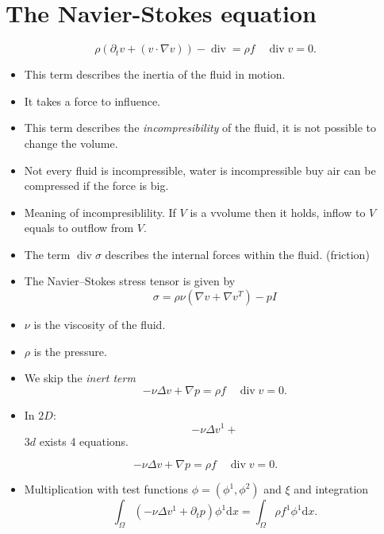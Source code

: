 \documentclass[
	a4paper,
	11pt,
	oneside
]{scrreprt}
\theoremstyle{definition}
\renewcommand{\div}{\operatorname{div}}
\begin{document}
\section{The Navier-Stokes equation}

\[ \rho\left(\partial_{t}v+\left(v\cdot\nabla v\right)\right)-\div=\rho f\quad\div v=0. \]

\begin{itemize}
	\item This term describes the inertia of the fluid in motion.
	\item It takes a force to influence.%
\end{itemize}

\begin{itemize}
	\item This term describes the \textit{incompresibility} of the fluid, it is not possible to change the volume.
	\item Not every fluid is incompressible, water is incompressible buy air can be compressed if the force is big.
	\item Meaning of incompresiblility. If $V$ is a vvolume then it holds, inflow to $V$ equals to outflow from $V$.
\end{itemize}

\begin{itemize}
	\item The term $\div\sigma$ describes the internal forces within the fluid. (friction)
	\item The Navier--Stokes stress tensor is given by \[ \sigma=\rho\nu\left(\nabla v+\nabla v^{T}\right)-pI\] %
	\item $\nu$ is the viscosity of the fluid.
	\item $\rho$ is the pressure.
\end{itemize}

\begin{itemize}
	\item We skip the \textit{inert term} \[ -\nu\Delta v+\nabla p=\rho f\quad\div v=0. \]%
	\item In $2D$: \[ -\nu\Delta v^{1}+ \] $3d$ exists 4 equations.
\end{itemize}

\[ -\nu\Delta v+\nabla p=\rho f\quad\div v=0. \]

\begin{itemize}
	\item Multiplication with test functions $\phi=\left(\phi^{1},\phi^{2}\right)$ and $\xi$ and integration \[ \int_{\Omega}\left(-\nu\Delta v^{1}+\partial_{t}p\right)\phi^{1}\mathrm{d}x=\int_{\Omega}\rho f^{1}\phi^{1}\mathrm{d}x. \]%
\end{itemize}
\end{document}
